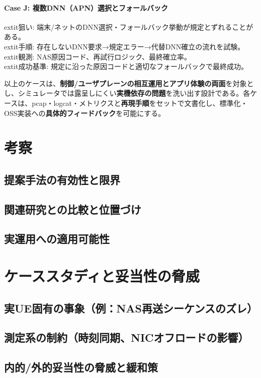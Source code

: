 \paragraph{Case J: 複数DNN（APN）選択とフォールバック}
	extit{狙い}: 端末/ネットのDNN選択・フォールバック挙動が規定とずれることがある。\\
	extit{手順}: 存在しないDNN要求→規定エラー→代替DNN確立の流れを試験。\\
	extit{観測}: NAS原因コード、再試行ロジック、最終確立率。\\
	extit{成功基準}: 規定に沿った原因コードと適切なフォールバックで最終成功。

以上のケースは、\textbf{制御/ユーザプレーンの相互運用とアプリ体験の両面}を対象とし、シミュレータでは露呈しにくい\textbf{実機依存の問題}を洗い出す設計である。各ケースは、pcap・logcat・メトリクスと\textbf{再現手順}をセットで文書化し、標準化・OSS実装への\textbf{具体的フィードバック}を可能にする。

\section{考察}
\subsection{提案手法の有効性と限界}
\subsection{関連研究との比較と位置づけ}
\subsection{実運用への適用可能性}

\section{ケーススタディと妥当性の脅威}
\subsection{実UE固有の事象（例：NAS再送シーケンスのズレ）}
\subsection{測定系の制約（時刻同期、NICオフロードの影響）}
\subsection{内的/外的妥当性の脅威と緩和策}
